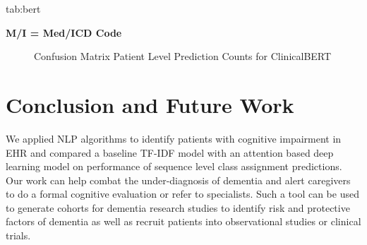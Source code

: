 \documentclass[pmlr,twocolumn,10pt]{jmlr} %
\begin{document}
\begin{table}[htb]
\floatconts
{tab:bert}
{\caption{Comparison between Other Indicators of Cognitive Impairment and ClinicalBERT}}
\centering
{}

\bfseries M/I = Med/ICD Code 
\end{table}


\begin{figure}[htb]
\caption{Confusion Matrix Patient Level Prediction Counts for ClinicalBERT}
\end{figure}

\section{Conclusion and Future Work} 
\label{sec:ConclusionFutureWork} We applied NLP algorithms to identify patients with cognitive impairment in EHR and compared a baseline TF-IDF model with an attention based deep learning model on performance of sequence level class assignment predictions. Our work can help combat the under-diagnosis of dementia and alert caregivers to do a formal cognitive evaluation or refer to specialists. Such a tool can be used to generate cohorts for dementia research studies to identify risk and protective factors of dementia as well as recruit patients into observational studies or clinical trials. 
\end{document}
